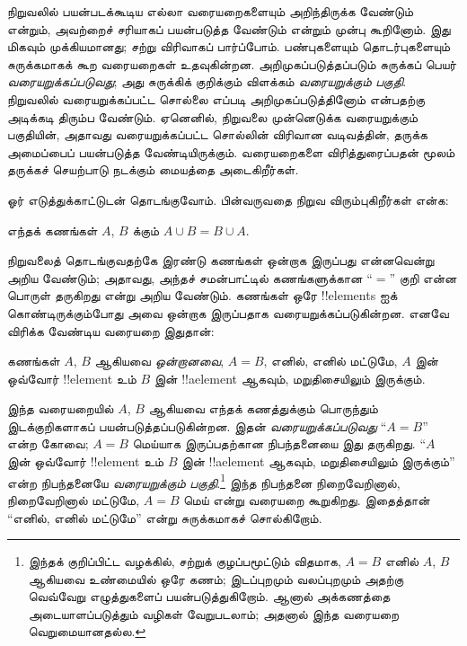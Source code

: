 \documentclass[../../../include/open-logic-section]{subfiles}
\begin{document}


நிறுவலில் பயன்படக்கூடிய எல்லா வரையறைகளையும் அறிந்திருக்க
வேண்டும் என்றும், அவற்றைச் சரியாகப் பயன்படுத்த வேண்டும்
என்றும் முன்பு கூறினோம். இது மிகவும் முக்கியமானது; சற்று
விரிவாகப் பார்ப்போம். பண்புகளையும் தொடர்புகளையும் சுருக்கமாகக்
கூற வரையறைகள் உதவுகின்றன. அறிமுகப்படுத்தப்படும் சுருக்கப் பெயர்
\emph{வரையறுக்கப்படுவது}; அது சுருக்கிக் குறிக்கும் விளக்கம்
\emph{வரையறுக்கும் பகுதி}. நிறுவலில் வரையறுக்கப்பட்ட சொல்லை
எப்படி அறிமுகப்படுத்தினோம் என்பதற்கு அடிக்கடி திரும்ப வேண்டும்.
ஏனெனில், நிறுவலை முன்னெடுக்க வரையறுக்கும் பகுதியின், அதாவது
வரையறுக்கப்பட்ட சொல்லின் விரிவான வடிவத்தின், தருக்க அமைப்பைப்
பயன்படுத்த வேண்டியிருக்கும். வரையறைகளை விரித்துரைப்பதன்
மூலம் தருக்கச் செயற்பாடு நடக்கும் மையத்தை அடைகிறீர்கள்.

ஓர் எடுத்துக்காட்டுடன் தொடங்குவோம். பின்வருவதை நிறுவ
விரும்புகிறீர்கள் என்க:

\begin{prop}
எந்தக் கணங்கள் $A$, $B$ க்கும் $A \cup B = B \cup A$.
\end{prop}

நிறுவலைத் தொடங்குவதற்கே இரண்டு கணங்கள் ஒன்றாக இருப்பது
என்னவென்று அறிய வேண்டும்; அதாவது, அந்தச் சமன்பாட்டில்
கணங்களுக்கான ``$=$'' குறி என்ன பொருள் தருகிறது என்று அறிய
வேண்டும். கணங்கள் ஒரே !!{element}s ஐக் கொண்டிருக்கும்போது
அவை ஒன்றாக இருப்பதாக வரையறுக்கப்படுகின்றன. எனவே விரிக்க
வேண்டிய வரையறை இதுதான்:

\begin{defn}
கணங்கள் $A$, $B$ ஆகியவை \emph{ஒன்றானவை}, $A = B$, எனில்,
எனில் மட்டுமே, $A$ இன் ஒவ்வோர் !!{element} உம் $B$ இன்
!!a{element} ஆகவும், மறுதிசையிலும் இருக்கும்.
\end{defn}

இந்த வரையறையில் $A$, $B$ ஆகியவை எந்தக் கணத்துக்கும்
பொருந்தும் இடக்குறிகளாகப் பயன்படுத்தப்படுகின்றன. இதன்
\emph{வரையறுக்கப்படுவது} ``$A = B$'' என்ற கோவை;
$A = B$ மெய்யாக இருப்பதற்கான நிபந்தனையை இது தருகிறது.
``$A$ இன் ஒவ்வோர் !!{element} உம் $B$ இன்
!!a{element} ஆகவும், மறுதிசையிலும் இருக்கும்'' என்ற
நிபந்தனையே \emph{வரையறுக்கும் பகுதி}.\footnote{இந்தக்
  குறிப்பிட்ட வழக்கில், சற்றுக் குழப்பமூட்டும் விதமாக,
  $A = B$ எனில் $A$, $B$ ஆகியவை உண்மையில் ஒரே கணம்;
  இடப்புறமும் வலப்புறமும் அதற்கு வெவ்வேறு எழுத்துகளைப்
  பயன்படுத்துகிறோம். ஆனால் அக்கணத்தை அடையாளப்படுத்தும்
  வழிகள் வேறுபடலாம்; அதனால் இந்த வரையறை வெறுமையானதல்ல.}
இந்த நிபந்தனை நிறைவேறினால், நிறைவேறினால் மட்டுமே, $A = B$
மெய் என்று வரையறை கூறுகிறது. இதைத்தான் ``எனில், எனில்
மட்டுமே'' என்று சுருக்கமாகச் சொல்கிறோம்.
\end{document}
